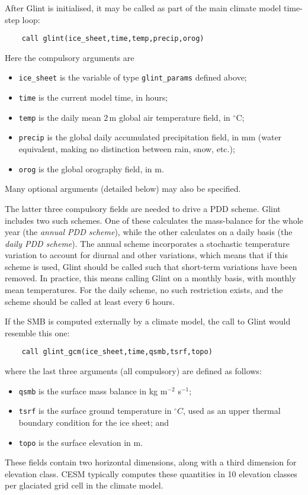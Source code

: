 After Glint is initialised, it may be called as part of the main climate
model time-step loop:
%
\begin{verbatim}
    call glint(ice_sheet,time,temp,precip,orog)
\end{verbatim} 
%
Here the compulsory arguments are
%
\begin{itemize}
\item \texttt{ice\_sheet} is the variable of type \texttt{glint\_params} defined above;
\item \texttt{time} is the current model time, in hours;
\item \texttt{temp} is the daily mean $2\,\mathrm{m}$ global air temperature field, in
  $^{\circ}\mathrm{C}$;
\item \texttt{precip} is the global daily accumulated precipitation field,
  in $\mathrm{mm}$ (water equivalent, making no distinction
  between rain, snow, etc.);
\item \texttt{orog} is the global orography field, in $\mathrm{m}$.
\end{itemize}
Many optional arguments (detailed below) may also be specified.

The latter three compulsory fields are needed to drive a PDD scheme.
Glint includes two such schemes.  One of these calculates the mass-balance for the
whole year (the \emph{annual PDD scheme}), while the other calculates on a
daily basis (the \emph{daily PDD scheme}). The annual scheme incorporates a
stochastic temperature variation to account for diurnal and other variations,
which means that if this scheme is used, Glint should be called such
that short-term variations have been removed.  In practice, this means calling 
Glint on a monthly basis, with monthly mean temperatures. 
For the daily scheme, no such restriction exists,
and the scheme should be called at least every 6 hours.

If the SMB is computed externally by a climate model, the call to Glint would resemble this one:
\begin{verbatim}
    call glint_gcm(ice_sheet,time,qsmb,tsrf,topo)
\end{verbatim} 
%
where the last three arguments (all compulsory) are defined as follows:
%
\begin{itemize}
\item \texttt{qsmb} is the surface mass balance in kg m$^{-2}$ s$^{-1}$;
\item \texttt{tsrf} is the surface ground temperature in $^{\circ} C$, used as an upper 
thermal boundary condition for the ice sheet; and
\item \texttt{topo} is the surface elevation in m.
\end{itemize}
These fields contain two horizontal dimensions, along with a third dimension
for elevation class.  CESM typically computes these quantities in 10 elevation classes
per glaciated grid cell in the climate model.

